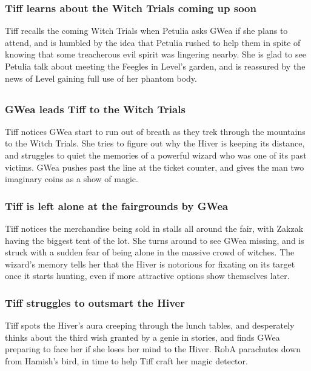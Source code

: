 \subsubsection{\Gls{Tiff} learns about the Witch Trials coming up soon}
\Gls{Tiff} recalls the coming Witch Trials when \Gls{Petulia} asks \Gls{GWea} if she plans to
attend, and is humbled by the idea that \Gls{Petulia} rushed to help them in spite of knowing that
some treacherous evil spirit was lingering nearby. She is glad to see \Gls{Petulia} talk about
meeting the Feegles in \Gls{Level}'s garden, and is reassured by the news of \Gls{Level} gaining
full use of her phantom body.

\subsection{}
\subsubsection{\Gls{GWea} leads \Gls{Tiff} to the Witch Trials}
\Gls{Tiff} notices \Gls{GWea} start to run out of breath as they trek through the mountains to the
Witch Trials. She tries to figure out why the \Gls{Hiver} is keeping its distance, and struggles
to quiet the memories of a powerful wizard who was one of its past victims. \Gls{GWea} pushes past
the line at the ticket counter, and gives the man two imaginary coins as a show of magic.

\subsubsection{\Gls{Tiff} is left alone at the fairgrounds by \Gls{GWea}}
\Gls{Tiff} notices the merchandise being sold in stalls all around the fair, with \Gls{Zakzak}
having the biggest tent of the lot. She turns around to see \Gls{GWea} missing, and is struck with
a sudden fear of being alone in the massive crowd of witches. The wizard's memory tells her that
the \Gls{Hiver} is notorious for fixating on its target once it starts hunting, even if more
attractive options show themselves later.

\subsubsection{\Gls{Tiff} struggles to outsmart the \Gls{Hiver}}
\Gls{Tiff} spots the \Gls{Hiver}'s aura creeping through the lunch tables, and desperately thinks
about the third wish granted by a genie in stories, and finds \Gls{GWea} preparing to face her if
she loses her mind to the \Gls{Hiver}. \Gls{RobA} parachutes down from \Gls{Hamish}'s bird, in time
to help \Gls{Tiff} craft her magic detector.


